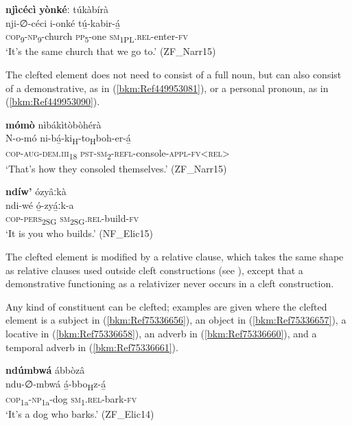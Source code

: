 \ea
\label{bkm:Ref98513182}
\textbf{njìcécì} \textbf{yònkéː} túkàbírà\\
\gll nji-∅-céci    i-onké    tú̲-kabir-á̲\\
\textsc{cop}\textsubscript{9}-\textsc{np}\textsubscript{9}-church  \textsc{pp}\textsubscript{5}-one  \textsc{sm}\textsubscript{1PL\-}.\textsc{rel}-enter-\textsc{fv}\\
\glt ‘It’s the same church that we go to.’ (ZF\_Narr15)
\z

The clefted element does not need to consist of a full noun, but can also consist of a demonstrative, as in (\ref{bkm:Ref449953081}), or a personal pronoun, as in (\ref{bkm:Ref449953090}).

\ea
\label{bkm:Ref449953081}
\textbf{mómò} nìbákìtòbòhérà\\
\gll N-o-mó    ni-bá̲-ki\textsubscript{H}-to\textsubscript{H}boh-er-á̲\\
\textsc{cop}-\textsc{aug}-\textsc{dem}.\textsc{iii}\textsubscript{18}  \textsc{pst}-\textsc{sm}\textsubscript{2}-\textsc{refl}-console-\textsc{appl}-\textsc{fv}<\textsc{rel}>\\
\glt ‘That’s how they consoled themselves.’ (ZF\_Narr15)
\z

\ea
\label{bkm:Ref449953090}
\textbf{ndíw’} ózyâːkà\\
\gll ndi-wé  ó̲-zyá̲ːk-a\\
\textsc{cop}-\textsc{pers}\textsubscript{2SG}  \textsc{sm}\textsubscript{2SG}.\textsc{rel}-build-\textsc{fv}\\
\glt ‘It is you who builds.’ (NF\_Elic15)
\z

The clefted element is modified by a relative clause, which takes the same shape as relative clauses used outside cleft constructions (see ), except that a demonstrative functioning as a relativizer never occurs in a cleft construction.

Any kind of constituent can be clefted; examples are given where the clefted element is a subject in (\ref{bkm:Ref75336656}), an object in (\ref{bkm:Ref75336657}), a locative in (\ref{bkm:Ref75336658}), an adverb in (\ref{bkm:Ref75336660}), and a temporal adverb in (\ref{bkm:Ref75336661}).

\ea
\label{bkm:Ref75336656}
\textbf{ndúmbwá} ábbòzâ\\
\gll ndu-∅-mbwá  á̲-bbo\textsubscript{H}z-á̲\\
\textsc{cop}\textsubscript{1a}-\textsc{np}\textsubscript{1a}-dog  \textsc{sm}\-\textsubscript{1}.\textsc{rel}-bark-\textsc{fv}\\
\glt ‘It’s a dog who barks.’ (ZF\_Elic14)
\z

